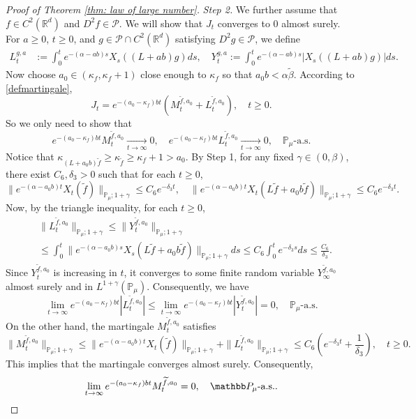 \documentclass[EJP]{ejpecp} %
\begin{document}
\begin{proof}[Proof of Theorem \ref{thm: law of large number}]
  	\emph{Step 2.} We further assume that $f\in C^2(\mathbb R^d)$ and $D^2f \in \mathcal{P}$.
  	We will show that $J_t$ converges to $0$ almost surely.
	For $a \geq 0$, $ t\geq 0$, and $g\in \mathcal{P}\cap C^2(\mathbb{R}^d)$ satisfying $D^2g\in \mathcal{P}$, we define
\begin{align}
    L_t^{g,a}
    & :=\int_0^t e^{-(\alpha-ab)s}X_s((L+ab)g) ds,
    \quad
    Y_t^{g,a}
    :=\int_0^t e^{-(\alpha-ab)s}|X_s((L+ab)g)|ds.
\end{align}
	Now choose $a_0 \in (\kappa_{f}, \kappa_f + 1)$ close enough to $\kappa_f$ so that $a_0 b < \alpha \tilde \beta$.
	According to \eqref{defmartingale},
\[
    J_t
    = e^{-(a_0-\kappa_f)bt} (M_t^{\widetilde{f}, a_0}+L_t^{\widetilde{f}, a_0}),
    \quad t\geq 0.
\]
	So we only need to show that
\[
    e^{-(a_0-\kappa_f)b t}M_t^{\widetilde{f},a_0}
    \xrightarrow[t\to \infty]{} 0,
    \quad e^{-(a_0-\kappa_f)b t}L_t^{\widetilde{f},a_0}
    \xrightarrow[t\to \infty]{} 0,
    \quad \mathbb{P}_{\mu}\text{-a.s.}
\]
	Notice that $\kappa_{(L+a_0 b)\widetilde{f}}\geq \kappa_{\widetilde{f}}\geq \kappa_f+1 > a_0$.
	By Step 1, for any fixed $\gamma\in (0,\beta)$, there exist $C_6, \delta_3>0$ such that for each $t\geq 0$,
\[
    \| e^{-(\alpha-a_0 b)t} X_t(\widetilde{f})\|_{\mathbb{P}_{\mu};1+\gamma}
    \leq C_6 e^{-\delta_3 t},
    \quad \|e^{-(\alpha-a_0 b)t}X_t(L\widetilde{f}+a_0 b\widetilde{f})\|_{\mathbb{P}_{\mu};1+\gamma}
    \leq C_6 e^{-\delta_3 t}.
\]
	Now, by the triangle inequality, for each $t\geq 0$,
\begin{align}
    & \|L_t^{\widetilde{f},a_0}\|_{\mathbb{P}_{\mu};1+\gamma}
   	\leq\|Y_t^{\widetilde{f},a_0}\|_{\mathbb{P}_{\mu};1+\gamma} \\
    & \leq \int_0^t \|e^{-(\alpha-a_0 b)s}X_s( L\widetilde{f}+a_0 b\widetilde{f})\|_{\mathbb{P}_{\mu};1+\gamma}ds\leq C_6 \int_0^t e^{-\delta_3 s}ds\leq\frac{C_6}{\delta_3}.
\end{align}
	Since $Y_t^{\widetilde{f},a_0}$ is increasing in $t$, it converges to some finite random variable $Y_{\infty}^{\widetilde{f},a_0}$ almost surely and in $L^{1+\gamma}(\mathbb{P}_{\mu})$.
	Consequently,  we have
\[
    \lim_{t\rightarrow \infty}e^{-(a_0 - \kappa_f)bt}|L_t^{\widetilde{f},a_0}|
    \leq  \lim_{t\rightarrow \infty}e^{-(a_0 - \kappa_f)bt}|Y_t^{\widetilde{f},a_0}|=0,
    \quad \mathbb P_\mu\text{-a.s.}
\]
	On the other hand, the martingale $M_t^{\widetilde{f},a_0}$ satisfies
\[
    \|M_t^{\widetilde{f},a_0}\|_{\mathbb{P}_{\mu};1+\gamma}
    \leq \|e^{-(\alpha-a_0 b)t}X_t(\widetilde{f})\|_{\mathbb{P}_{\mu};1+\gamma}+\|L_t^{\widetilde{f},a_0}\|_{\mathbb{P}_{\mu};1+\gamma}
    \leq C_6(e^{-\delta_3 t}+\frac{1}{\delta_3}),
    \quad t\geq 0.
\]
	This implies that the martingale converges almost surely.
	Consequently,
\[
    \lim_{t\rightarrow\infty} e^{-(a_0-\kappa_f)bt}M_t^{\widetilde{f},a_0}
    = 0,
    \quad \mathbb P_\mu\text{-a.s.}.
    \qedhere
\]
\end{proof}
\end{document}
